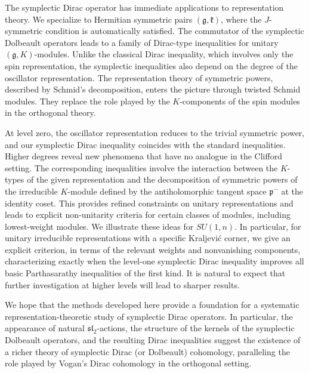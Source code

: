 \documentclass{amsart}[draft,11pt]
\numberwithin{equation}{section}
\theoremstyle{definition}
\begin{document}
\smallskip

The symplectic Dirac operator has immediate applications to representation theory. We specialize to Hermitian symmetric pairs {$({\mathfrak g},{\mathfrak k})$}, where the $J$-symmetric condition is automatically satisfied.  The
commutator of the symplectic Dolbeault operators leads to a family of Dirac-type inequalities for unitary $({\mathfrak g},K)$-modules. Unlike the classical Dirac inequality, which involves only the spin representation, the symplectic inequalities also depend on the degree of the oscillator representation. The representation theory of symmetric powers, described by Schmid's decomposition, enters the picture through twisted Schmid modules. They replace the role played by
{the $K$-components of the }
spin modules in the orthogonal theory.

\smallskip

At level zero, the oscillator representation reduces to the trivial symmetric power, and our symplectic Dirac inequality coincides with the standard inequalities. Higher degrees reveal new phenomena that have no analogue in the Clifford setting. The corresponding inequalities involve the interaction between the $K$-types of the given representation and the decomposition of symmetric powers of the irreducible $K$-module defined by the antiholomorphic tangent space $\mathfrak{p}^{-}$ at the identity coset. This provides refined constraints on unitary representations and leads to explicit non-unitarity criteria for certain classes of modules, including lowest-weight modules. We illustrate these ideas for $SU(1,n)$. In particular, for unitary irreducible representations with a specific Kraljevi\'c corner, we give an explicit criterion, in terms of the relevant weights and nonvanishing components, characterizing exactly when the level-one symplectic Dirac inequality improves all basic Parthasarathy inequalities of the first kind. It is natural to expect that further investigation at higher levels will lead to sharper results.

\smallskip 
We hope that the methods developed here provide a foundation for a systematic representation-theoretic study of symplectic Dirac operators. In particular, the appearance of natural $\mathfrak{sl}_2$-actions, the structure of the kernels of the symplectic Dolbeault operators, and the resulting Dirac inequalities suggest the existence of a richer theory of symplectic Dirac (or Dolbeault) cohomology, paralleling the role played by Vogan’s Dirac cohomology in the orthogonal setting. 
\end{document}
